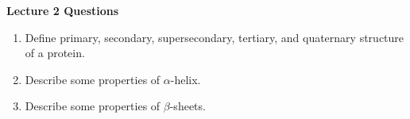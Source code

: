 \newpage
\begin{center}
\textbf{Lecture 2 Questions}
\end{center}

\begin{enumerate}

\item Define primary, secondary, supersecondary, tertiary, and quaternary structure of a protein.




\item Describe some properties of $\alpha$-helix.


\item Describe some properties of $\beta$-sheets.



\end{enumerate}
